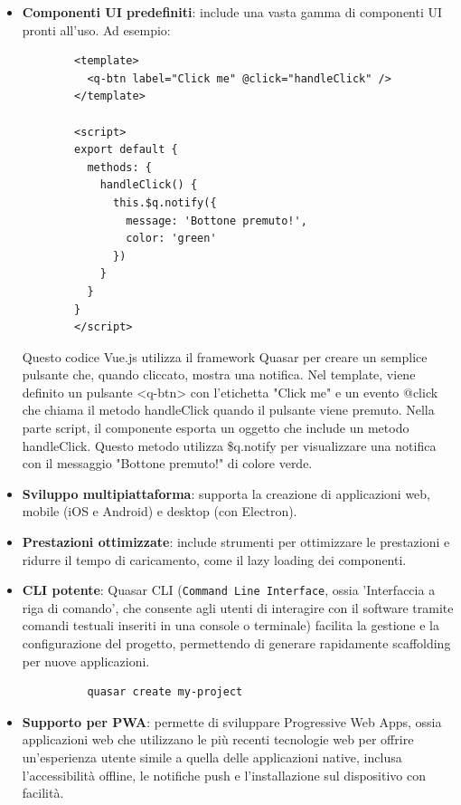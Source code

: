 \documentclass[a4paper, 12pt]{book}
\begin{document}
\begin{itemize}
  \item \textbf{Componenti UI predefiniti}: include una vasta gamma di componenti UI pronti all'uso. Ad esempio:\\
        \begin{lstlisting}
        <template>
          <q-btn label="Click me" @click="handleClick" />
        </template>

        <script>
        export default {
          methods: {
            handleClick() {
              this.$q.notify({
                message: 'Bottone premuto!',
                color: 'green'
              })
            }
          }
        }
        </script>
        \end{lstlisting}
        Questo codice Vue.js utilizza il framework Quasar per creare un semplice pulsante che, quando cliccato,
        mostra una notifica. Nel template, viene definito un pulsante <q-btn> con l'etichetta "Click me" e un
        evento @click che chiama il metodo handleClick quando il pulsante viene premuto. Nella parte script,
        il componente esporta un oggetto che include un metodo handleClick. Questo metodo utilizza \$q.notify
        per visualizzare una notifica con il messaggio "Bottone premuto!" di colore verde.
  \item \textbf{Sviluppo multipiattaforma}: supporta la creazione di applicazioni web, mobile (iOS e Android) e desktop (con Electron).
  \item \textbf{Prestazioni ottimizzate}: include strumenti per ottimizzare le prestazioni e ridurre il tempo di caricamento, come il
        lazy loading dei componenti.
  \item \textbf{CLI potente}: Quasar CLI (\texttt{Command Line Interface}, ossia 'Interfaccia a riga di comando',
        che consente agli utenti di interagire con il software tramite comandi testuali inseriti in una console o terminale)
        facilita la gestione e la configurazione del progetto, permettendo
        di generare rapidamente scaffolding per nuove applicazioni.\\
        \begin{lstlisting}
          quasar create my-project
        \end{lstlisting}
  \item \textbf{Supporto per PWA}: permette di sviluppare Progressive Web Apps, ossia applicazioni web che utilizzano le più
        recenti tecnologie web per offrire un'esperienza utente simile a quella delle applicazioni native, inclusa
        l'accessibilità offline, le notifiche push e l'installazione sul dispositivo con facilità.\\
\end{itemize}
\end{document}
